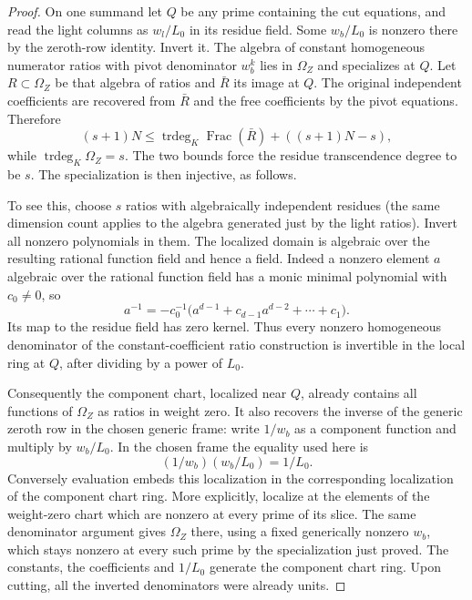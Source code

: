 \begin{proof}
On one summand let \(Q\) be any prime containing the cut equations,
and read the light columns as \(w_l/L_0\) in its residue field. Some
\(w_b/L_0\) is nonzero there by the zeroth-row identity. Invert it.
The algebra of constant homogeneous numerator ratios with pivot
denominator \(w_b^k\) lies in \(\Omega_Z\) and specializes at \(Q\).
Let \(R\subset\Omega_Z\) be that algebra of ratios and
\(\bar R\) its image at \(Q\). The original independent
coefficients are recovered from \(\bar R\) and the free
coefficients by the pivot equations. Therefore
\[
 (s+1)N
 \le \operatorname{trdeg}_K\operatorname{Frac}(\bar R)
                            +((s+1)N-s),
\]
while \(\operatorname{trdeg}_K\Omega_Z=s\). The two bounds
force the residue transcendence degree to be \(s\).
The specialization is then injective, as follows.

To see this, choose \(s\) ratios with
algebraically independent residues (the same dimension count applies
to the algebra generated just by the light ratios). Invert all
nonzero polynomials in them. The localized domain is algebraic over
the resulting rational function field and hence a field.
Indeed a nonzero element \(a\) algebraic over the rational function field has a monic minimal polynomial with \(c_0\ne0\), so
\[
  a^{-1}=-c_0^{-1}\big(a^{d-1}+c_{d-1}a^{d-2}+\cdots+c_1\big).
\]
 Its map to
the residue field has zero kernel. Thus every nonzero homogeneous
denominator of the constant-coefficient ratio construction is
invertible in the local ring at \(Q\), after dividing by a power of
\(L_0\).

Consequently the component chart, localized near \(Q\), already
contains all functions of \(\Omega_Z\) as ratios in weight zero.
It also recovers the inverse of the generic zeroth row in the
chosen generic frame: write \(1/w_b\) as a component function
and multiply by \(w_b/L_0\).
In the chosen frame the equality used here is
\[
  (1/w_b)(w_b/L_0)=1/L_0 .
\]
 Conversely evaluation embeds this
localization in the corresponding localization of the component
chart ring. More explicitly, localize at the elements of the
weight-zero chart which are nonzero at every prime of its slice.
The same denominator argument gives \(\Omega_Z\) there, using a
fixed generically nonzero \(w_b\), which stays nonzero at every
such prime by the specialization just proved. The constants, the
coefficients and \(1/L_0\) generate the component chart ring.
Upon cutting, all the inverted denominators were already units.


\end{proof}

